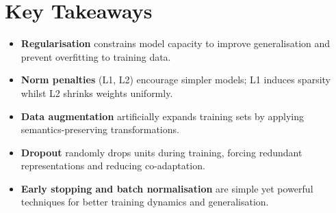 
\section*{Key Takeaways}

\begin{keytakeaways}
\begin{itemize}[leftmargin=2em]
    \item \textbf{Regularisation} constrains model capacity to improve generalisation and prevent overfitting to training data.
    \item \textbf{Norm penalties} (L1, L2) encourage simpler models; L1 induces sparsity whilst L2 shrinks weights uniformly.
    \item \textbf{Data augmentation} artificially expands training sets by applying semantics-preserving transformations.
    \item \textbf{Dropout} randomly drops units during training, forcing redundant representations and reducing co-adaptation.
    \item \textbf{Early stopping and batch normalisation} are simple yet powerful techniques for better training dynamics and generalisation.
\end{itemize}
\end{keytakeaways}


